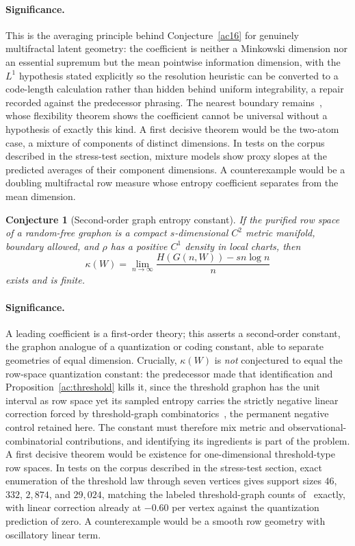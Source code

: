\documentclass[11pt]{article}
\newtheorem{conjecture}{Conjecture}
\theoremstyle{definition}
\begin{document}
\paragraph{Significance.}
This is the averaging principle behind Conjecture~\ref{ac16} for genuinely multifractal latent geometry: the coefficient is neither a Minkowski dimension nor an essential supremum but the mean pointwise information dimension, with the $L^1$ hypothesis stated explicitly so the resolution heuristic can be converted to a code-length calculation rather than hidden behind uniform integrability, a repair recorded against the predecessor phrasing.  The nearest boundary remains~\cite{HN13}, whose flexibility theorem shows the coefficient cannot be universal without a hypothesis of exactly this kind.  A first decisive theorem would be the two-atom case, a mixture of components of distinct dimensions.  In tests on the corpus described in the stress-test section, mixture models show proxy slopes at the predicted averages of their component dimensions.  A counterexample would be a doubling multifractal row measure whose entropy coefficient separates from the mean dimension.

\begin{conjecture}[Second-order graph entropy constant]\label{ac18}
If the purified row space of a random-free graphon is a compact $s$-dimensional $C^2$ metric manifold, boundary allowed, and $\rho$ has a positive $C^1$ density in local charts, then
\[
\kappa(W)=\lim_{n\to\infty}\frac{H(G(n,W))-sn\log n}{n}
\]
exists and is finite.
\end{conjecture}

\paragraph{Significance.}
A leading coefficient is a first-order theory; this asserts a second-order constant, the graphon analogue of a quantization or coding constant, able to separate geometries of equal dimension.  Crucially, $\kappa(W)$ is \emph{not} conjectured to equal the row-space quantization constant: the predecessor made that identification and Proposition~\ref{ac:threshold} kills it, since the threshold graphon has the unit interval as row space yet its sampled entropy carries the strictly negative linear correction forced by threshold-graph combinatorics~\cite{Spi20}, the permanent negative control retained here.  The constant must therefore mix metric and observational-combinatorial contributions, and identifying its ingredients is part of the problem.  A first decisive theorem would be existence for one-dimensional threshold-type row spaces.  In tests on the corpus described in the stress-test section, exact enumeration of the threshold law through seven vertices gives support sizes $46$, $332$, $2{,}874$, and $29{,}024$, matching the labeled threshold-graph counts of~\cite{Spi20} exactly, with linear correction already at $-0.60$ per vertex against the quantization prediction of zero.  A counterexample would be a smooth row geometry with oscillatory linear term.
\end{document}

